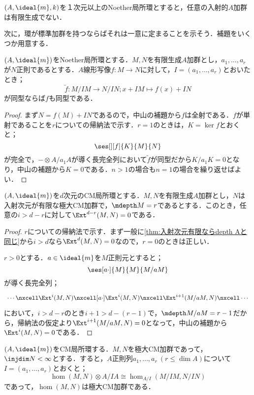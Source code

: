 \begin{cor}
	$(A,\ideal{m},k)$を１次元以上のNoether局所環とすると，任意の入射的$A$加群は有限生成でない．
\end{cor}

次に，環が標準加群を持つならばそれは一意に定まることを示そう．補題をいくつか用意する．

\begin{lem}\label{lem:正則列で落として同型ならもとも同型}
	$(A,\ideal{m})$をNoether局所環とする．$M,N$を有限生成$A$加群とし，$a_1,\dots,a_r$が$N$正則であるとする．$A$線形写像$f:M\to N$に対して，$I=(a_1,\dots,a_r)$とおいたとき；
	\[\widetilde{f}:M/IM\to N/IN;x+IM\mapsto f(x)+IN\]
	が同型ならば$f$も同型である．
\end{lem}

\begin{proof}
	まず$N=f(M)+IN$であるので，中山の補題から$f$は全射である．$f$が単射であることを$r$についての帰納法で示す．$r=1$のときは，$K=\ker f$とおくと；
	\[\ses[][f]{K}{M}{N}\]
	が完全で，$-\otimes A/a_1A$が導く長完全列において$\widetilde{f}$が同型だから$K/a_1K=0$となり，中山の補題から$K=0$である．$n>1$の場合も$n=1$の場合を繰り返せばよい．
\end{proof}

\begin{lem}
	$(A,\ideal{m})$を$d$次元のCM局所環とする．$M,N$を有限生成$A$加群とし，$N$は入射次元が有限な極大CM加群で，$\mdepth M=r$であるとする．このとき，任意の$i>d-r$に対して$\Ext^{d-r}(M,N)=0$である．
\end{lem}

\begin{proof}
	$r$についての帰納法で示す．まず一般に\ref{thm:入射次元有限ならdepth Aと同じ}から$i>d$なら$\Ext^d(M,N)=0$なので，$r=0$のときは正しい．
	
	$r>0$とする．$a\in\ideal{m}$を$M$正則元とすると；
	\[\ses[a\cdot]{M}{M}{M/aM}\]
	が導く長完全列；
	\[\begin{tikzcd}
		\cdots\nxcell\Ext^i(M,N)\nxcell[a\cdot]\Ext^i(M,N)\nxcell\Ext^{i+1}(M/aM,N)\nxcell\cdots
	\end{tikzcd}\]
	において，$i>d-r$のとき$i+1>d-(r-1)$で，$\mdepth M/aM=r-1$だから，帰納法の仮定より$\Ext^{i+1}(M/aM,N)=0$となって，中山の補題から$\Ext^i(M,N)=0$である．
\end{proof}

\begin{prop}\label{prop:極大CMのhomも極大CM}
	$(A,\ideal{m})$をCM局所環する．$M,N$を極大CM加群であって，$\injdim N<\infty$とする．すると，$A$正則列$a_1,\dots,a_r~(r\leq\dim A)$について$I=(a_1,\dots,a_r)$とおくと；
	\[\hom(M,N)\otimes A/IA\cong\hom_{A/I}(M/IM,N/IN)\tag{$\ast$}\]
	であって，$\hom(M,N)$は極大CM加群である．
\end{prop}

